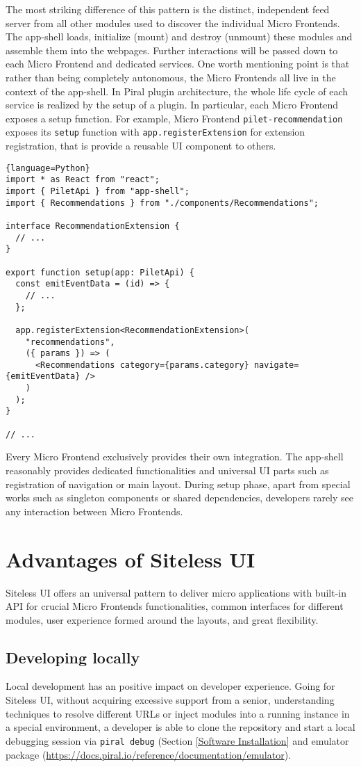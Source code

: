 \documentclass[a4paper]{book}
\begin{document}
The most striking difference of this pattern is the distinct, independent feed server from all other modules used to discover the individual Micro Frontends. The app-shell loads, initialize (mount) and destroy (unmount) these modules and assemble them into the webpages. Further interactions will be passed down to each Micro Frontend and dedicated services. One worth mentioning point is that rather than being completely autonomous, the Micro Frontends all live in the context of the app-shell. In Piral plugin architecture, the whole life cycle of each service is realized by the setup of a plugin. In particular, each Micro Frontend exposes a setup function. For example, Micro Frontend \verb|pilet-recommendation| exposes its \verb|setup| function with \verb|app.registerExtension| for extension registration, that is provide a reusable UI component to others.
\begin{lstlisting}{language=Python}
import * as React from "react";
import { PiletApi } from "app-shell";
import { Recommendations } from "./components/Recommendations";

interface RecommendationExtension {
  // ...
}

export function setup(app: PiletApi) {
  const emitEventData = (id) => {
    // ...
  };

  app.registerExtension<RecommendationExtension>(
    "recommendations",
    ({ params }) => (
      <Recommendations category={params.category} navigate={emitEventData} />
    )
  );
}

// ...
\end{lstlisting}
Every Micro Frontend exclusively provides their own integration. The app-shell reasonably provides dedicated functionalities and universal UI parts such as registration of navigation or main layout. During setup phase, apart from special works such as singleton components or shared dependencies, developers rarely see any interaction between Micro Frontends.
\section{Advantages  of Siteless UI}
Siteless UI offers an universal pattern to deliver micro applications with built-in API for crucial Micro Frontends functionalities, common interfaces for different modules,  user experience formed around the layouts, and great flexibility.

\subsection{Developing locally}
Local development has an positive impact on developer experience. Going for Siteless UI, without acquiring excessive support from a senior, understanding techniques to resolve different URLs or inject modules into a running instance in a special environment, a developer is able to clone the repository and start a local debugging session via \verb|piral debug| (Section \ref{Software Installation} and  emulator package (\url{https://docs.piral.io/reference/documentation/emulator}).
\end{document}
